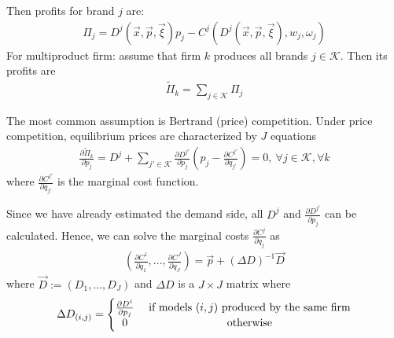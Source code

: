 \documentclass[11pt]{elegantbook}
\begin{document}
Then profits for brand $j$ are:
\begin{equation}
    \begin{aligned}
        \Pi_j=D^j\left(\vec{x},\vec{p},\vec{\xi}\right)p_j-C^j\left(D^j\left(\vec{x},\vec{p},\vec{\xi}\right),w_j,\omega_j\right)
    \end{aligned}
    \nonumber
\end{equation}
For multiproduct firm: assume that firm $k$ produces all brands $j \in \mathcal{K}$. Then its profits are
\begin{equation}
    \begin{aligned}
        \tilde{\Pi}_k=\sum_{j \in \mathcal{K}}\Pi_j
    \end{aligned}
    \nonumber
\end{equation}

The most common assumption is Bertrand (price) competition. Under price competition, equilibrium prices are characterized by $J$ equations
\begin{equation}
    \begin{aligned}
        \frac{\partial \tilde{\Pi}_k}{\partial p_j}=D^j+\sum_{j'\in \mathcal{K}}\frac{\partial D^{j'}}{\partial p_j}\left(p_j-\frac{\partial C^{j'}}{\partial q_{j'}}\right)=0,\ \forall j\in \mathcal{K},\forall k
    \end{aligned}
    \nonumber
\end{equation}
where $\frac{\partial C^{j'}}{\partial q_{j'}}$ is the marginal cost function.

Since we have already estimated the demand side, all $D^j$ and $\frac{\partial D^{j'}}{\partial p_j}$ can be calculated. Hence, we can solve the marginal costs $\frac{\partial C^{j}}{\partial q_{j}}$ as
\begin{equation}
    \begin{aligned}
        \left(\frac{\partial C^{1}}{\partial q_{1}},...,\frac{\partial C^{J}}{\partial q_{J}}\right)=\vec{p}+(\Delta D)^{-1}\vec{D}
    \end{aligned}
    \nonumber
\end{equation}
where $\vec{D}:=\left(D_1,...,D_J\right)$ and $\Delta D$ is a $J\times J$ matrix where
\begin{equation}
    \begin{aligned}
        \Delta D_{(i,j)}=
        \left\{\begin{matrix}
            \frac{\partial D^{i}}{\partial p_j}& \textnormal{ if models $(i,j)$ produced by the same firm}\\
            0& \textnormal{ otherwise}
        \end{matrix}\right.
    \end{aligned}
    \nonumber
\end{equation}
\end{document}
